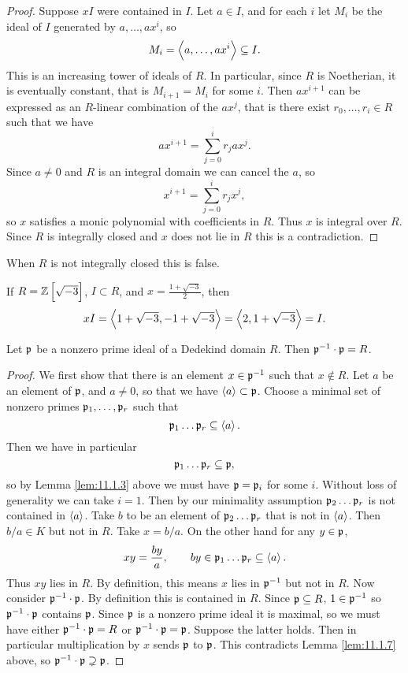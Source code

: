 \begin{proof}
Suppose $ xI $ were contained in $ I $. Let $ a \in I $, and for each $ i $ let $ M_i $ be the ideal of $ I $ generated by $ a, \dots, ax^i $, so
$$ M_i = \left\langle a, \dots, ax^i \right\rangle \subseteq I. $$
This is an increasing tower of ideals of $ R $. In particular, since $ R $ is Noetherian, it is eventually constant, that is $ M_{i + 1} = M_i $ for some $ i $. Then $ ax^{i + 1} $ can be expressed as an $ R $-linear combination of the $ ax^j $, that is there exist $ r_0, \dots, r_i \in R $ such that we have
$$ ax^{i + 1} = \sum_{j = 0}^i r_jax^j. $$
Since $ a \ne 0 $ and $ R $ is an integral domain we can cancel the $ a $, so
$$ x^{i + 1} = \sum_{j = 0}^i r_jx^j, $$
so $ x $ satisfies a monic polynomial with coefficients in $ R $. Thus $ x $ is integral over $ R $. Since $ R $ is integrally closed and $ x $ does not lie in $ R $ this is a contradiction.
\end{proof}

When $ R $ is not integrally closed this is false.

\pagebreak

\begin{example*}
If $ R = \Z\sbr{\sqrt{-3}} $, $ I \subset R $, and $ x = \tfrac{1 + \sqrt{-3}}{2} $, then
$$ xI = \left\langle 1 + \sqrt{-3}, -1 + \sqrt{-3} \right\rangle = \left\langle 2, 1 + \sqrt{-3} \right\rangle = I. $$
\end{example*}

\begin{proposition}
\label{prop:11.1.8}
Let $ \mathfrak{p} $ be a nonzero prime ideal of a Dedekind domain $ R $. Then $ \mathfrak{p}^{-1} \cdot \mathfrak{p} = R $.
\end{proposition}

\begin{proof}
We first show that there is an element $ x \in \mathfrak{p}^{-1} $ such that $ x \notin R $. Let $ a $ be an element of $ \mathfrak{p} $, and $ a \ne 0 $, so that we have $ \left\langle a \right\rangle \subset \mathfrak{p} $. Choose a minimal set of nonzero primes $ \mathfrak{p}_1, \dots, \mathfrak{p}_r $ such that
$$ \mathfrak{p}_1 \dots \mathfrak{p}_r \subseteq \left\langle a \right\rangle. $$
Then we have in particular
$$ \mathfrak{p}_1 \dots \mathfrak{p}_r \subseteq \mathfrak{p}, $$
so by Lemma \ref{lem:11.1.3} above we must have $ \mathfrak{p} = \mathfrak{p}_i $ for some $ i $. Without loss of generality we can take $ i = 1 $. Then by our minimality assumption $ \mathfrak{p}_2 \dots \mathfrak{p}_r $ is not contained in $ \left\langle a \right\rangle $. Take $ b $ to be an element of $ \mathfrak{p}_2 \dots \mathfrak{p}_r $ that is not in $ \left\langle a \right\rangle $. Then $ b / a \in K $ but not in $ R $. Take $ x = b / a $. On the other hand for any $ y \in \mathfrak{p} $,
$$ xy = \dfrac{by}{a}, \qquad by \in \mathfrak{p}_1 \dots \mathfrak{p}_r \subseteq \left\langle a \right\rangle. $$
Thus $ xy $ lies in $ R $. By definition, this means $ x $ lies in $ \mathfrak{p}^{-1} $ but not in $ R $. Now consider $ \mathfrak{p}^{-1} \cdot \mathfrak{p} $. By definition this is contained in $ R $. Since $ \mathfrak{p} \subseteq R $, $ 1 \in \mathfrak{p}^{-1} $ so $ \mathfrak{p}^{-1} \cdot \mathfrak{p} $ contains $ \mathfrak{p} $. Since $ \mathfrak{p} $ is a nonzero prime ideal it is maximal, so we must have either $ \mathfrak{p}^{-1} \cdot \mathfrak{p} = R $ or $ \mathfrak{p}^{-1} \cdot \mathfrak{p} = \mathfrak{p} $. Suppose the latter holds. Then in particular multiplication by $ x $ sends $ \mathfrak{p} $ to $ \mathfrak{p} $. This contradicts Lemma \ref{lem:11.1.7} above, so $ \mathfrak{p}^{-1} \cdot \mathfrak{p} \supsetneq \mathfrak{p} $.
\end{proof}

